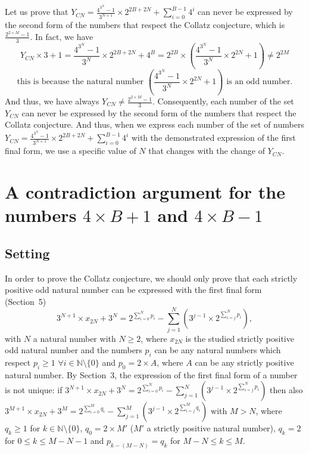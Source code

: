 \documentclass[11pt,a4paper]{article}
\newcommand{\N}{\mathbb{N}}
\newcommand{\Pf}[4]{2^{\sum_{#4=0}^{#1}#3_{#4}}-\sum_{j=1}^{#2}\left(3^{j-1}\times 2^{\sum_{#4=j}^{#1}#3_{#4}}\right)}
\newcommand{\Fone}{3^{N+1}\times x_{2N}+3^{N}=\Pf{N}{N}{p}{i}}
\theoremstyle{definition}
\begin{document}
Let us prove that $Y_{CN}=\frac{4^{3^{N}}-1}{3^{N+1}}\times 2^{2B+2N}+\sum_{i=0}^{B-1}4^{i}$
can never be expressed by the second form of the numbers that respect the Collatz conjecture,
which is $\frac{2^{2\times M}-1}{3}$. In fact, we have
\begin{equation}
Y_{CN}\times 3+1=\frac{4^{3^{N}}-1}{3^{N}}\times 2^{2B+2N}+4^{B}=2^{2B}\times\left(\frac{4^{3^{N}}-1}{3^{N}}\times 2^{2N}+1\right)\ne 2^{2M}
\end{equation}
\begin{equation}
\text{this is because the natural number }\left(\frac{4^{3^{N}}-1}{3^{N}}\times 2^{2N}+1\right)\text{ is an odd number.}
\end{equation}
And thus, we have always $Y_{CN}\ne\frac{2^{2\times M}-1}{3}$. Consequently, each number of
the set $Y_{CN}$ can never be expressed by the second form of the numbers that respect the
Collatz conjecture. And thus, when we express each number of the set of numbers
$Y_{CN}=\frac{4^{3^{N}}-1}{3^{N+1}}\times 2^{2B+2N}+\sum_{i=0}^{B-1}4^{i}$ with the
demonstrated expression of the first final form, we use a specific value of $N$ that changes
with the change of $Y_{CN}$.

\section{A contradiction argument for the numbers $4\times B+1$ and $4\times B-1$}\label{sec:contra}

\subsection{Setting}
In order to prove the Collatz conjecture, we should only prove that each strictly positive
odd natural number can be expressed with the first final form (Section~5)
\[\Fone,\]
with $N$ a natural number with $N\ge 2$, where $x_{2N}$ is the studied strictly positive odd natural number and the numbers $p_i$ can
be any natural numbers which respect $p_i\ge 1$ $\forall i\in\N\setminus\{0\}$ and
$p_0=2\times A$, where $A$ can be any strictly positive natural number. By Section~3, the
expression of the first final form of a number is not unique: if
$3^{N+1}\times x_{2N}+3^{N}=\Pf{N}{N}{p}{i}$ then also
$3^{M+1}\times x_{2N}+3^{M}=\Pf{M}{M}{q}{i}$ with $M>N$, where $q_k\ge 1$ for
$k\in\N\setminus\{0\}$, $q_0=2\times M'$ ($M'$ a strictly positive natural number),
$q_k=2$ for $0\le k\le M-N-1$ and $p_{k-(M-N)}=q_k$ for $M-N\le k\le M$.
\end{document}
